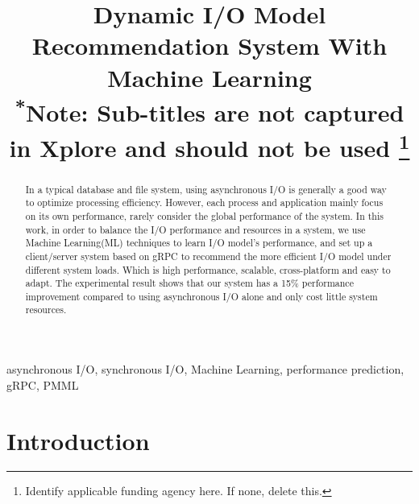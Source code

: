 \documentclass[conference]{IEEEtran}
\begin{document}
\title{Dynamic I/O Model Recommendation System With Machine Learning\\
{\footnotesize \textsuperscript{*}Note: Sub-titles are not captured in Xplore and
should not be used}
\thanks{Identify applicable funding agency here. If none, delete this.}
}

\author{
	\and
}

\maketitle

\begin{abstract}
	In a typical database and file system, using asynchronous I/O is generally a good way to optimize processing efficiency.
	However, each process and application mainly focus on its own performance, rarely consider the global performance of the system.
	In this work, in order to balance the I/O performance and resources in a system, we use Machine Learning(ML) techniques to learn I/O model's performance,
	and set up a client/server system based on gRPC to recommend the more efficient I/O model under different system loads. Which is high performance, scalable, cross-platform and easy to adapt.
	The experimental result shows that our system has a 15\% performance improvement compared to using asynchronous I/O alone and only cost little system resources.

\end{abstract}

\renewcommand\IEEEkeywordsname{Keywords}
\begin{IEEEkeywords}
	asynchronous I/O, synchronous I/O, Machine Learning, performance prediction, gRPC, PMML
\end{IEEEkeywords}

\section{Introduction}
\end{document}
